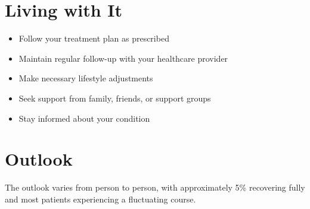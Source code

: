 \section{Living with It}
\begin{itemize}[noitemsep]
  \item Follow your treatment plan as prescribed
  \item Maintain regular follow-up with your healthcare provider
  \item Make necessary lifestyle adjustments
  \item Seek support from family, friends, or support groups
  \item Stay informed about your condition
\end{itemize}
\section{Outlook}
The outlook varies from person to person, with approximately 5\% recovering fully and most patients experiencing a fluctuating course.

